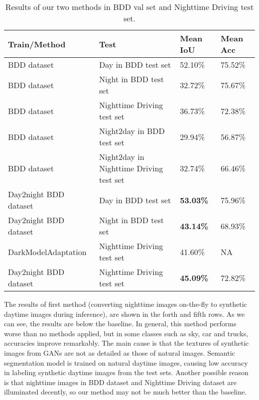 \documentclass[a4paper]{spie}
\begin{document}
\begin{table}[ht]
   \caption{Results of our two methods in BDD val set and Nighttime Driving test set.} 
   \label{tab:results}
   \begin{center}       
   \begin{tabular}{|l|l||l|l|}
   \hline
   \rule[-1ex]{0pt}{3.5ex}  \textbf{Train/Method} & \textbf{Test} & \textbf{Mean IoU} & \textbf{Mean Acc} \\
   \hline
   \hline
   \rule[-1ex]{0pt}{3.5ex}  BDD dataset & Day in BDD test set & 52.10\% & 75.52\%  \\
   \hline
   \rule[-1ex]{0pt}{3.5ex}  BDD dataset & Night in BDD test set & 32.72\% & 75.67\%  \\
   \hline
   \rule[-1ex]{0pt}{3.5ex}  BDD dataset &  Nighttime Driving test set & 36.73\% & 72.38\%  \\
   \hline
   \hline
   \rule[-1ex]{0pt}{3.5ex}  BDD dataset & Night2day in BDD test set & 29.94\% & 56.87\%  \\
   \hline
   \rule[-1ex]{0pt}{3.5ex}  BDD dataset & Night2day in Nighttime Driving test set & 32.74\% & 66.46\%  \\
   \hline
   \hline
   \rule[-1ex]{0pt}{3.5ex}  Day2night BDD dataset & Day in BDD test set & \textbf{53.03\%} & 75.96\%  \\
   \hline
   \rule[-1ex]{0pt}{3.5ex}  Day2night BDD dataset & Night in BDD test set & \textbf{43.14\%} & 68.93\%  \\
   \hline
   \rule[-1ex]{0pt}{3.5ex}  DarkModelAdaptation~\cite{dai2018dark} & Nighttime Driving test set & 41.60\% & NA  \\
   \hline
   \rule[-1ex]{0pt}{3.5ex}  Day2night BDD dataset & Nighttime Driving test set & \textbf{45.09\%} & 72.82\%  \\
   \hline
   \end{tabular}
   \end{center}
   \end{table}

   
The results of first method (converting nighttime images on-the-fly to synthetic daytime images during inference), are shown in the forth and fifth rows. As we can see, the results are below the baseline. In general, this method performs worse than no methods applied, but in some classes such as sky, car and trucks, accuracies improve remarkably. The main cause is that the textures of synthetic images from GANs are not as detailed as those of natural images. Semantic segmentation model is trained on natural daytime images, causing low accuracy in labeling synthetic daytime images from the test sets. Another possible reason is that nighttime images in BDD dataset and Nighttime Driving dataset are illuminated decently, so our method may not be much better than the baseline.
\end{document}
